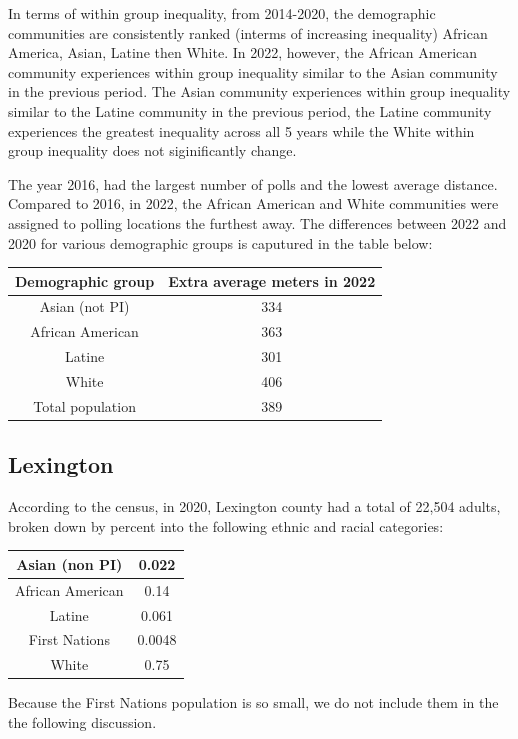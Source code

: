 \documentclass[11pt]{article}
\theoremstyle{remark}
\theoremstyle{definition}
\begin{document}
In terms of within group inequality, from 2014-2020, the demographic communities are consistently ranked (interms of increasing inequality) African America, Asian, Latine then White. In 2022, however, the African American community experiences within group inequality similar to the Asian community in the previous period. The Asian community experiences within group inequality similar to the Latine community in the previous period, the Latine community experiences the greatest inequality across all 5 years while the White within group inequality does not siginificantly change. 

The year 2016, had the largest number of polls and the lowest average distance. Compared to 2016, in 2022, the African American and White communities were assigned to polling locations the furthest away. The differences between 2022 and 2020 for various demographic groups is caputured in the table below:

\begin{tabular}{|c|c|}
	\hline
	Demographic group & Extra average meters in 2022 \\ \hline
	Asian (not PI) &   334 \\ \hline
	African American &   363  \\ \hline
	Latine & 301 \\ \hline
	White &  406\\ \hline
	Total population &  389\\ \hline
\end{tabular}

\subsection{Lexington \label{sec:Lexington distances}}
According to the census, in 2020, Lexington county had a total of 22,504  adults, broken down by percent into the following ethnic and racial categories:

\begin{tabular} {| c | c |} 
	\hline
	Asian (non PI) &  0.022 \\ \hline
	African American & 0.14 \\ \hline
	Latine & 0.061 \\ \hline
	First Nations & 0.0048 \\ \hline
	White  & 0.75 \\ \hline
\end{tabular}

Because the First Nations population is so small, we do not include them in the the following discussion.
\end{document}
